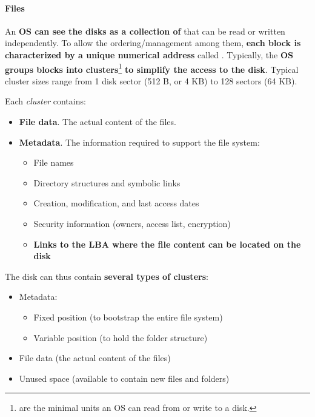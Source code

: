 \newpage

\paragraph{Files}

An \textbf{OS can see the disks as a collection of}  that can be read or written independently. To allow the ordering/management among them, \textbf{each block is characterized by a unique numerical address} called \label{LBA (Logical Block Address)}. Typically, the \textbf{OS groups blocks into clusters}\footnote{ are the minimal units an OS can read from or write to a disk.} \textbf{to simplify the access to the disk}. Typical cluster sizes range from 1 disk sector (512 B, or 4 KB) to 128 sectors (64 KB).

\highspace
Each \emph{cluster} contains:
\begin{itemize}
    \item \textbf{File data}. The actual content of the files.
    
    \item \textbf{Metadata}. The information required to support the file system:
    \begin{itemize}
        \item File names
        \item Directory structures and symbolic links
        \item Creation, modification, and last access dates
        \item Security information (owners, access list, encryption)
        \item \textbf{Links to the LBA where the file content can be located on the disk}
    \end{itemize}
\end{itemize}
The disk can thus contain \textbf{several types of clusters}:
\begin{itemize}
    \item Metadata:
    \begin{itemize}
        \item Fixed position (to bootstrap the entire file system)
        \item Variable position (to hold the folder structure)
    \end{itemize}
    
    \item File data (the actual content of the files)
    
    \item Unused space (available to contain new files and folders)
\end{itemize}

